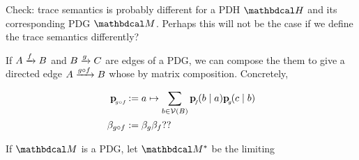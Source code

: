 \documentclass[the-pdg-manual.tex]{subfiles}
\begin{document}
Check: trace semantics is probably different for a PDH $\dg H$ and its corresponding PDG $\dg M$.
Perhaps this will not be the case if we define the trace semantics differently? 


\begin{defn}[composition]
	If $\ed fAB$ and $\ed gBC$ are edges of a PDG, we can compose the them to give a directed edge
	$\ed{g\circ f}AB$ whose  by matrix composition. Concretely, 
	\begin{inactive}
	\begin{align*}
		\bp[g\circ f] &:= a \mapsto \sum_{b \in \V(B)} \bp[f](b\mid a)\bp[g](c \mid b) \\
		\beta_{g \circ f} &:= \beta_g \beta_f ??
	\end{align*}
	\end{inactive}
\end{defn}
\begin{defn}
	If $\dg M$ is a PDG, let $\dg M^*$ be the limiting
\end{defn}
\end{document}
